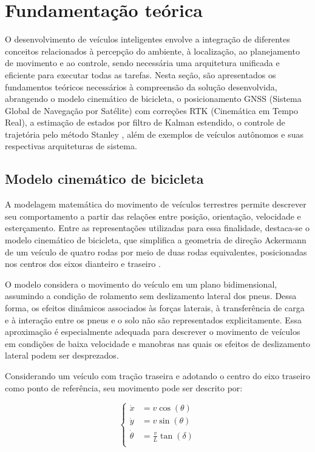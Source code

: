 \section{Fundamentação teórica}
\label{sec:fundamentacao}

O desenvolvimento de veículos inteligentes envolve a integração de diferentes conceitos relacionados à percepção do ambiente, à localização, ao planejamento de movimento e ao controle, sendo necessária uma arquitetura unificada e eficiente para executar todas as tarefas. Nesta seção, são apresentados os fundamentos teóricos necessários à compreensão da solução desenvolvida, abrangendo o modelo cinemático de bicicleta, o posicionamento GNSS (Sistema Global de Navegação por Satélite) com correções RTK (Cinemática em Tempo Real), a estimação de estados por filtro de Kalman estendido, o controle de trajetória pelo método Stanley \citep{Thrun2006}, além de exemplos de veículos autônomos e suas respectivas arquiteturas de sistema.

\subsection{Modelo cinemático de bicicleta}
\label{subsec:modelo_bicicleta}

A modelagem matemática do movimento de veículos terrestres permite descrever seu comportamento a partir das relações entre posição, orientação, velocidade e esterçamento. Entre as representações utilizadas para essa finalidade, destaca-se o modelo cinemático de bicicleta, que simplifica a geometria de direção Ackermann de um veículo de quatro rodas por meio de duas rodas equivalentes, posicionadas nos centros dos eixos dianteiro e traseiro \citep{Snider2009}. 

O modelo considera o movimento do veículo em um plano bidimensional, assumindo a condição de rolamento sem deslizamento lateral dos pneus. Dessa forma, os efeitos dinâmicos associados às forças laterais, à transferência de carga e à interação entre os pneus e o solo não são representados explicitamente. Essa aproximação é especialmente adequada para descrever o movimento de veículos em condições de baixa velocidade e manobras nas quais os efeitos de deslizamento lateral podem ser desprezados. 

Considerando um veículo com tração traseira e adotando o centro do eixo traseiro como ponto de referência, seu movimento pode ser descrito por:

\begin{equation}
\label{eq:modelo_cinematico}
\left\{
\begin{aligned}
\dot{x} &= v\cos(\theta) \\
\dot{y} &= v\sin(\theta) \\
\dot{\theta} &= \frac{v}{L}\tan(\delta)\\
\end{aligned}
\right.
\end{equation}

